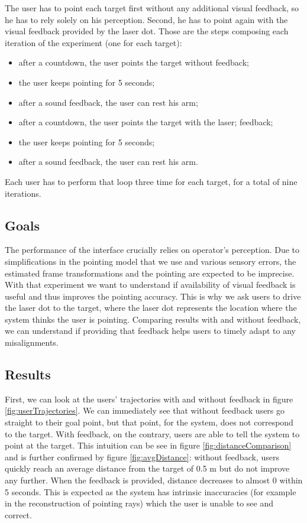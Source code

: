 The user has to point each target first without any additional visual feedback, so he has to rely solely on his perception. Second, he has to point again with the visual feedback provided by the laser dot. Those are the steps composing each iteration of the experiment (one for each target):
\begin{itemize}
    \item after a countdown, the user points the target without feedback;
    \item the user keeps pointing for 5 seconds;
    \item after a sound feedback, the user can rest his arm;
    \item after a countdown, the user points the target with the laser; feedback;
    \item the user keeps pointing for 5 seconds;
    \item after a sound feedback, the user can rest his arm.
\end{itemize}
Each user has to perform that loop three time for each target, for a total of nine iterations.
\subsection{Goals}
The performance of the interface crucially relies on operator’s perception. Due to simplifications in the pointing model that we use and various sensory errors, the estimated frame transformations and the pointing are expected to be imprecise.\\
With that experiment we want to understand if availability of visual feedback is useful and thus improves the pointing accuracy. This is why we ask users to drive the laser dot to the target, where the laser dot represents the location where the system thinks the user is pointing. Comparing results with and without feedback, we can understand if providing that feedback helps users to timely adapt to any misalignments.

\subsection{Results}
First, we can look at the users' trajectories with and without feedback in figure \ref{fig:userTrajectories}. We can immediately see that without feedback users go straight to their goal point, but that point, for the system, does not correspond to the target. With feedback, on the contrary, users are able to tell the system to point at the target. This intuition can be see in figure \ref{fig:distanceComparison} and is further confirmed by figure \ref{fig:avgDistance}: without feedback, users quickly reach an average distance from the target of 0.5 m but do not improve any further. When the feedback is provided, distance decreases to almost 0 within 5 seconds. This is expected as the system has intrinsic inaccuracies (for example in the reconstruction of pointing rays) which the user is unable to see and correct. 

